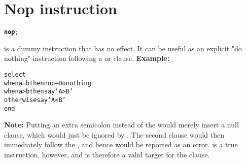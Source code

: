 \chapter{Nop instruction}
\begin{shaded}
\begin{alltt}
\textbf{nop};
\end{alltt}
\end{shaded}
  is a dummy instruction that has no effect.  It can be
useful as an explicit "do nothing" instruction following a
 or  clause.
 \textbf{Example:}
\begin{alltt}
select
  when a=b then nop           -- Do nothing
  when a>b then say 'A > B'
  otherwise     say 'A < B'
  end
\end{alltt}
\textbf{Note: }Putting an extra semicolon instead of the  would
merely insert a null clause, which would just be ignored by \nr{}.
The second  clause would then immediately follow the
, and hence would be reported as an error.
 is a true instruction, however, and is therefore a valid
target for the  clause.
